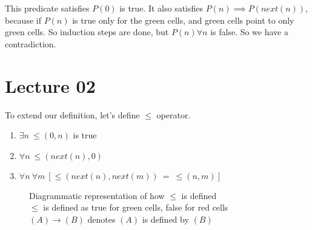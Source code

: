 \documentclass[a4paper,10pt]{article}
\theoremstyle{definition} %
\begin{document}
    This predicate satisfies $P(0)$ is true. It also satisfies $P(n) \implies P(next(n))$,
    because if $P(n)$ is true only for the green cells, and green cells point to only green cells.
    So induction steps are done, but $P(n) \forall n$ is false. So we have a contradiction.

    \section{Lecture 02}

    To extend our definition, let's define $\leq$ operator.

    \begin{tcolorbox}[colback=blue!10!white, colframe=blue!50!black]
        \begin{enumerate}
            \item $\exists n \ \leq(0, n)$ is true
            \item $\forall n \ \leq(next(n), 0)$
            \item $\forall n \  \forall m \ [\leq(next(n), next(m))\ = \ \leq(n, m)]$
        \end{enumerate}
    \end{tcolorbox}

    \begin{figure}[ht]
    \centering
    \captionsetup{justification=centering}  %
    \caption{Diagrammatic representation of how $\leq$ is defined \\
    $\leq$ is defined as true for green cells, false for red cells \\
    $(A) \rightarrow (B)$ denotes $(A)$ is defined by $(B)$}
    \end{figure}
\end{document}
